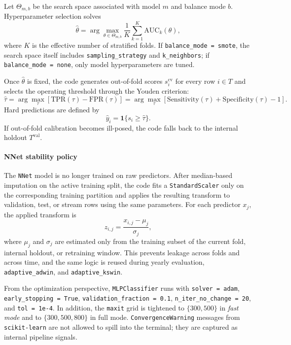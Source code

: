 Let \(\Theta_{m,b}\) be the search space associated with model \(m\) and balance mode \(b\). Hyperparameter selection solves
\[
\hat{\theta}
=
\arg\max_{\theta \in \Theta_{m,b}}
\frac{1}{K}
\sum_{k=1}^{K}
\mathrm{AUC}_k(\theta),
\]
where \(K\) is the effective number of stratified folds. If \texttt{balance\_mode = smote}, the search space itself includes \texttt{sampling\_strategy} and \texttt{k\_neighbors}; if \texttt{balance\_mode = none}, only model hyperparameters are tuned.

Once \(\hat{\theta}\) is fixed, the code generates out-of-fold scores \(s_i^{\mathrm{cv}}\) for every row \(i \in T\) and selects the operating threshold through the Youden criterion:
\[
\hat{\tau}
=
\arg\max_{\tau}
\left[
\mathrm{TPR}(\tau) - \mathrm{FPR}(\tau)
\right]
=
\arg\max_{\tau}
\left[
\mathrm{Sensitivity}(\tau) + \mathrm{Specificity}(\tau) - 1
\right].
\]
Hard predictions are defined by
\[
\hat{y}_i = \mathbf{1}\{s_i \ge \hat{\tau}\}.
\]
If out-of-fold calibration becomes ill-posed, the code falls back to the internal holdout \(T^{\mathrm{val}}\).

\paragraph{NNet stability policy}
The \texttt{NNet} model is no longer trained on raw predictors. After median-based imputation on the active training split, the code fits a \texttt{StandardScaler} only on the corresponding training partition and applies the resulting transform to validation, test, or stream rows using the same parameters. For each predictor \(x_j\), the applied transform is
\[
z_{i,j} = \frac{x_{i,j} - \mu_j}{\sigma_j},
\]
where \(\mu_j\) and \(\sigma_j\) are estimated only from the training subset of the current fold, internal holdout, or retraining window. This prevents leakage across folds and across time, and the same logic is reused during yearly evaluation, \texttt{adaptive\_adwin}, and \texttt{adaptive\_kswin}.

From the optimization perspective, \texttt{MLPClassifier} runs with \texttt{solver = adam}, \texttt{early\_stopping = True}, \texttt{validation\_fraction = 0.1}, \texttt{n\_iter\_no\_change = 20}, and \texttt{tol = 1e-4}. In addition, the \texttt{maxit} grid is tightened to $\{300,500\}$ in \textit{fast mode} and to $\{300,500,800\}$ in full mode. \texttt{ConvergenceWarning} messages from \texttt{scikit-learn} are not allowed to spill into the terminal; they are captured as internal pipeline signals.

